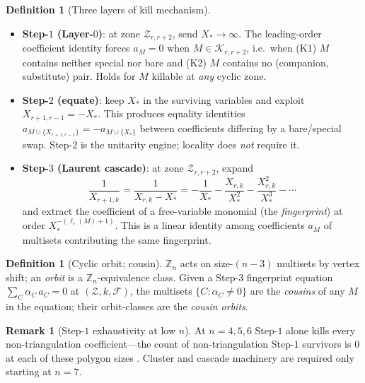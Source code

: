 \documentclass[11pt]{article}
\theoremstyle{definition}
\newtheorem{defn}[thm]{Definition}
\newtheorem{rem}[thm]{Remark}
\begin{document}
\begin{defn}[Three layers of kill mechanism]\label{def:layers}\leavevmode\\[-1.2em]
\begin{itemize}[leftmargin=*]
\item \textbf{Step-$1$ (Layer-$0$)}: at zone $\mathcal Z_{r,r+2}$,
send $X_*\to\infty$. The leading-order coefficient identity forces
$a_M=0$ when $M\in\mathcal K_{r,r+2}$, i.e.\ when (K1) $M$ contains
neither special nor bare and (K2) $M$ contains no
(companion, substitute) pair. Holds for $M$ killable at \emph{any}
cyclic zone.

\item \textbf{Step-$2$ (equate)}: keep $X_*$ in the surviving
variables and exploit $X_{r+1,r-1}=-X_*$. This produces equality
identities $a_{M\cup\{X_{r+1,r-1}\}}=-a_{M\cup\{X_*\}}$ between
coefficients differing by a bare/special swap. Step-$2$ is the
unitarity engine; locality does \emph{not} require it.

\item \textbf{Step-$3$ (Laurent cascade)}: at zone
$\mathcal Z_{r,r+2}$, expand
\[
\frac{1}{X_{r+1,k}}=\frac{1}{X_{r,k}-X_*}
=-\frac{1}{X_*}-\frac{X_{r,k}}{X_*^2}-\frac{X_{r,k}^2}{X_*^3}-\cdots
\]
and extract the coefficient of a free-variable monomial (the
\emph{fingerprint}) at order $X_*^{-(\ell_r(M)+1)}$. This is a
linear identity among coefficients $a_M$ of multisets contributing
the same fingerprint.
\end{itemize}
\end{defn}

\begin{defn}[Cyclic orbit; cousin]\label{def:orbit}
$\mathbb Z_n$ acts on size-$(n{-}3)$ multisets by vertex shift; an
\emph{orbit} is a $\mathbb Z_n$-equivalence class. Given a Step-$3$
fingerprint equation $\sum_C\alpha_C\,a_C=0$ at
$(\mathcal Z, k, \mathcal F)$, the multisets
$\{C : \alpha_C \ne 0\}$ are the \emph{cousins} of any $M$ in the
equation; their orbit-classes are the \emph{cousin orbits}.
\end{defn}

\begin{rem}[Step-$1$ exhaustivity at low $n$]\label{rem:low-n}
At $n=4,5,6$ Step-$1$ alone kills every non-triangulation
coefficient---the count of non-triangulation Step-$1$ survivors is
$0$ at each of these polygon sizes \cite{step1stats}. Cluster and
cascade machinery are required only starting at $n=7$.
\end{rem}
\end{document}
